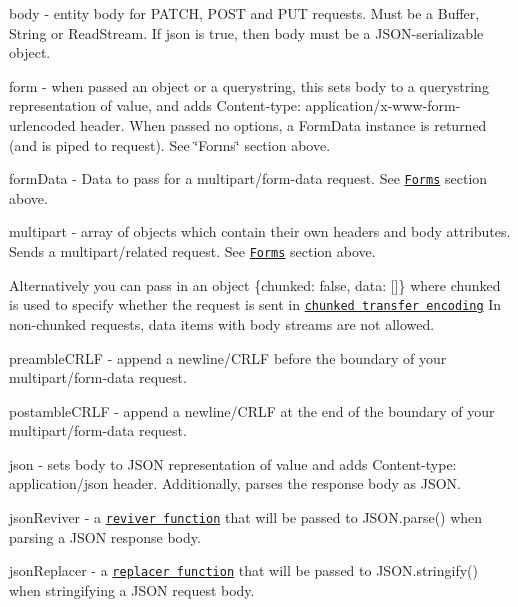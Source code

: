 \begin{DoxyItemize}
\item {\ttfamily body} -\/ entity body for P\+A\+T\+CH, P\+O\+ST and P\+UT requests. Must be a {\ttfamily Buffer}, {\ttfamily String} or {\ttfamily Read\+Stream}. If {\ttfamily json} is {\ttfamily true}, then {\ttfamily body} must be a J\+S\+O\+N-\/serializable object.
\item {\ttfamily form} -\/ when passed an object or a querystring, this sets {\ttfamily body} to a querystring representation of value, and adds {\ttfamily Content-\/type\+: application/x-\/www-\/form-\/urlencoded} header. When passed no options, a {\ttfamily Form\+Data} instance is returned (and is piped to request). See \char`\"{}\+Forms\char`\"{} section above.
\item {\ttfamily form\+Data} -\/ Data to pass for a {\ttfamily multipart/form-\/data} request. See \href{#forms}{\tt Forms} section above.
\item {\ttfamily multipart} -\/ array of objects which contain their own headers and {\ttfamily body} attributes. Sends a {\ttfamily multipart/related} request. See \href{#forms}{\tt Forms} section above.
\begin{DoxyItemize}
\item Alternatively you can pass in an object {\ttfamily \{chunked\+: false, data\+: \mbox{[}\mbox{]}\}} where {\ttfamily chunked} is used to specify whether the request is sent in \href{https://en.wikipedia.org/wiki/Chunked_transfer_encoding}{\tt chunked transfer encoding} In non-\/chunked requests, data items with body streams are not allowed.
\end{DoxyItemize}
\item {\ttfamily preamble\+C\+R\+LF} -\/ append a newline/\+C\+R\+LF before the boundary of your {\ttfamily multipart/form-\/data} request.
\item {\ttfamily postamble\+C\+R\+LF} -\/ append a newline/\+C\+R\+LF at the end of the boundary of your {\ttfamily multipart/form-\/data} request.
\item {\ttfamily json} -\/ sets {\ttfamily body} to J\+S\+ON representation of value and adds {\ttfamily Content-\/type\+: application/json} header. Additionally, parses the response body as J\+S\+ON.
\item {\ttfamily json\+Reviver} -\/ a \href{https://developer.mozilla.org/en-US/docs/Web/JavaScript/Reference/Global_Objects/JSON/parse}{\tt reviver function} that will be passed to {\ttfamily J\+S\+O\+N.\+parse()} when parsing a J\+S\+ON response body.
\item {\ttfamily json\+Replacer} -\/ a \href{https://developer.mozilla.org/en-US/docs/Web/JavaScript/Reference/Global_Objects/JSON/stringify}{\tt replacer function} that will be passed to {\ttfamily J\+S\+O\+N.\+stringify()} when stringifying a J\+S\+ON request body. 



\end{DoxyItemize}
